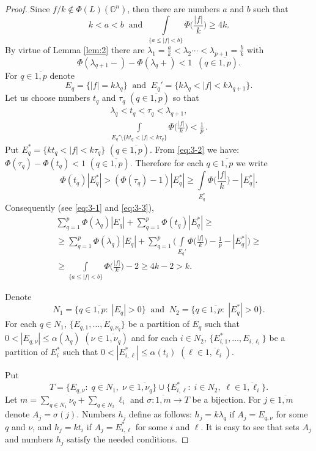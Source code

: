 \documentclass[12pt,reqno]{article}
\theoremstyle{remark}
\begin{document}
\begin{proof}
Since $f/k\not\in\Phi(L)(\mathbb{G}^n)$, then there are numbers $a$ and $b$ such that
\begin{equation}\label{eq:3-1}
    k<a<b \;\;\text{and}\;\; \int\limits_{\{a\leq|f|<b\}} \Phi\Big(\frac{|f|}{k}\Big)\geq 4k.
\end{equation}
By virtue of Lemma \ref{lem:2} there are $\lambda_1=\frac{a}{k}<\lambda_2\cdots<\lambda_{p+1}=\frac{b}{k}$ with
\begin{equation}\label{eq:3-2}
    \Phi(\lambda_{q+1}-)-\Phi(\lambda_q+)<1 \;\; (q\in\overline{1,p}).
\end{equation}
For $q\in\overline{1,p}$ denote
$$  E_q=\big\{|f|=k\lambda_q\big\} \;\;\text{and}\;\; E_q'=\big\{k\lambda_q<|f|<k\lambda_{q+1}\big\}.       $$
Let us choose numbers $t_q$ and $\tau_q$ $(q\in\overline{1,p})$ so that
\begin{gather}
    \lambda_q<t_q<\tau_q<\lambda_{q+1}, \nonumber \\
    \int\limits_{E_q'\setminus\{kt_q<|f|<k\tau_q\}} \Phi\Big(\frac{|f|}{k}\Big)<\frac{1}{p}\,. \label{eq:3-3}
\end{gather}
Put $E_q^{*}=\{kt_q<|f|<k\tau_q\}$ $(q\in\overline{1,p})$. From \eqref{eq:3-2} we have: $\Phi(\tau_q)-\Phi(t_q)<1$ $(q\in\overline{1,p})$. Therefore for each $q\in\overline{1,p}$ we write
$$  \Phi(t_q)|E_q^{*}|>(\Phi(\tau_q)-1)|E_q^{*}|\geq \int\limits_{E_q^{*}} \Phi\Big(\frac{|f|}{k}\Big)-|E_q^{*}|.   $$
Consequently (see \eqref{eq:3-1} and \eqref{eq:3-3}),
\begin{multline*}
    \sum_{q=1}^p \Phi(\lambda_q)|E_q|+\sum_{q=1}^p \Phi(t_q)|E_q^{*}|\geq \\
    \geq \sum_{q=1}^p \Phi(\lambda_q)|E_q|+\sum_{q=1}^p \bigg(\int\limits_{E_q'} \Phi\Big(\frac{|f|}{k}\Big)-\frac{1}{p}-|E_q^{*}|\bigg)\geq \\
    \geq \int\limits_{\{a\leq|f|<b\}} \Phi\Big(\frac{|f|}{k}\Big)-2\geq 4k-2>k.
\end{multline*}

Denote
$$  N_1=\big\{q\in\overline{1,p}:\;|E_q|>0\big\} \;\;\text{and}\;\; N_2=\big\{q\in\overline{1,p}:\;|E_q^{*}|>0\big\}.   $$
For each $q\in N_1$, $\{E_{q,1},\dots,E_{q,\nu_q}\}$ be a partition of $E_q$ such that $0<|E_{q,\nu}|\leq\alpha(\lambda_q)$ $(\nu\in\overline{1,\nu_q})$ and for each $i\in N_2$, $\{E_{i,1}^{*},\dots,E_{i,\ell_i}\}$ be a partition of $E_i^{*}$ such that $0<|E_{i,\ell}^{*}|\leq\alpha(t_i)$ $(\ell\in\overline{1,\ell_i})$.

Put
$$  T=\big\{E_{q,\nu}:\;q\in N_1,\;\nu\in\overline{1,\nu_q}\big\}\cup\big\{E_{i,\ell}^{*}:\;i\in N_2,\;\ell\in\overline{1,\ell_i}\big\}.     $$
Let $m=\sum\limits_{q\in N_1} \nu_q+\sum\limits_{q\in N_2} \ell_i$ and $\sigma:\overline{1,m}\to T$ be a bijection. For $j\in\overline{1,m}$ denote $A_j=\sigma(j)$. Numbers $h_j$ define as follows: $h_j=k\lambda_q$ if $A_j=E_{q,\nu}$ for some $q$ and $\nu$, and $h_j=kt_i$ if $A_j=E_{i,\ell}^{*}$ for some $i$ and $\ell$. It is easy to see that sets $A_j$ and numbers $h_j$ satisfy the needed conditions.
\end{proof}
\end{document}
